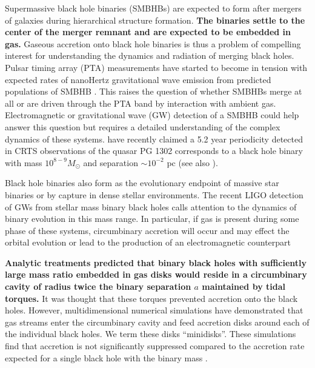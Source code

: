 \documentclass{emulateapj}
\begin{document}
Supermassive black hole binaries (SMBHBs) are expected to form after mergers of galaxies during hierarchical structure formation.  {\bf The binaries settle to the center of the merger remnant and are expected to be embedded in gas.} Gaseous accretion onto black hole binaries is thus a problem of compelling interest for understanding the dynamics and radiation of merging black holes. Pulsar timing array (PTA) measurements have started to become in tension with expected rates of nanoHertz gravitational wave emission from predicted populations of SMBHB \citep{Shannon15}. This raises the question of whether SMBHBs merge at all or are driven through the PTA band by interaction with ambient gas. Electromagnetic or gravitational wave (GW) detection of a SMBHB could help answer this question but requires a detailed understanding of the complex dynamics of these systems. \cite{Graham15A} have recently claimed a 5.2 year periodicity detected in CRTS observations of the quasar PG 1302 corresponds to a black hole binary with mass $10^{8-9}M_{\odot}$ and separation $\sim 10^{-2}$ pc (see also \citep{Graham15B}). 

Black hole binaries also form as the evolutionary endpoint of massive star binaries or by capture in dense stellar environments. The recent LIGO detection of GWs from stellar mass binary black holes calls attention to the dynamics of binary evolution in this mass range. In particular, if gas is present during some phase of these systems, circumbinary accretion will occur and may effect the orbital evolution or lead to the production of an electromagnetic counterpart \citep{Bartos16, Perna16}

{\bf Analytic treatments \citep{Artymowicz94,Milos05,Shapiro10} predicted that binary black holes with sufficiently large mass ratio embedded in gas disks would reside in a circumbinary cavity of radius twice the binary separation $a$ maintained by tidal torques. }It was thought that these torques prevented accretion onto the black holes. However, multidimensional numerical simulations \citep{MacFadyen08, Noble12, Farris12, DOrazio12,Gold14, Farris14, Farris15A, Farris15B,Shi15, Bankert15,Schnittman15,delValle15,Young15,DOrazio16, Munoz16,Miranda16} have demonstrated that gas streams enter the circumbinary cavity and feed accretion disks around each of the individual black holes. We term these disks ``minidisks''. These simulations find that accretion is not significantly suppressed compared to the accretion rate expected for a single black hole with the binary mass \citep{Farris14,Shi15}.
\end{document}
